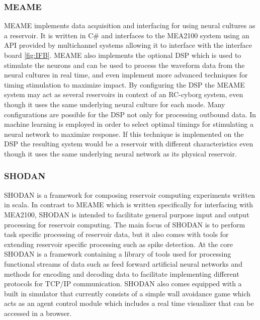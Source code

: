 \subsubsection{MEAME}
MEAME implements data acquisition and interfacing for using neural cultures as a
reservoir.
It is written in C\# and interfaces to the MEA2100 system using an API provided
by multichannel systems allowing it to interface with the interface board
\ref{fig:IFB}.
MEAME also implements the optional DSP which is used to stimulate the neurons
and can be used to process the waveform data from the neural cultures in real
time, and even implement more advanced techniques for timing stimulation to
maximize impact.
By configuring the DSP the MEAME system may act as several reservoirs in context
of an RC-cyborg system, even though it uses the same underlying neural culture
for each mode.
Many configurations are possible for the DSP not only for processing outbound
data.
In \cite{kumar_autonomous_2016} machine learning is employed in order to select
optimal timings for stimulating a neural network to maximize response.
If this technique is implemented on the DSP the resulting system would be a
reservoir with different characteristics even though it uses the same underlying
neural network as its physical reservoir.
\subsubsection{SHODAN}
SHODAN is a framework for composing reservoir computing experiments written in
scala. In contrast to MEAME which is written specifically for interfacing with
MEA2100, SHODAN is intended to facilitate general purpose input and output
processing for reservoir computing.
The main focus of SHODAN is to perform task specific processing of reservoir
data, but it also comes with tools for extending reservoir specific processing
such as spike detection.
At the core SHODAN is a framework containing a library of tools used for
processing functional streams of data such as feed forward artificial neural
networks and methods for encoding and decoding data to facilitate implementing
different protocols for TCP/IP communication.
SHODAN also comes equipped with a built in simulator that currently consists of
a simple wall avoidance game which acts as an agent control module which
includes a real time visualizer that can be accessed in a browser.
